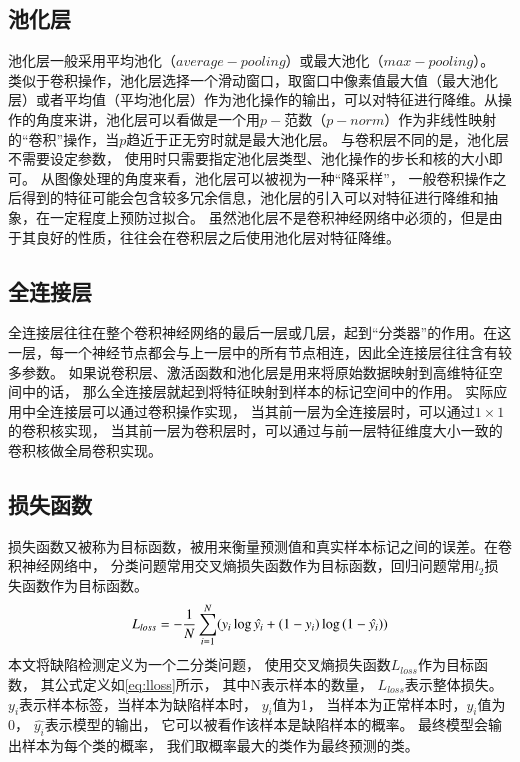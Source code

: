 \subsection{池化层}

池化层一般采用平均池化（$average-pooling$）或最大池化（$max-pooling$）。
类似于卷积操作，池化层选择一个滑动窗口，取窗口中像素值最大值（最大池化层）或者平均值（平均池化层）作为池化操作的输出，可以对特征进行降维。从操作的角度来讲，池化层可以看做是一个用$p-$范数（$p-norm$）作为非线性映射的“卷积”操作，当$p$趋近于正无穷时就是最大池化层。
与卷积层不同的是，池化层不需要设定参数，
使用时只需要指定池化层类型、池化操作的步长和核的大小即可。
从图像处理的角度来看，池化层可以被视为一种“降采样”，
一般卷积操作之后得到的特征可能会包含较多冗余信息，池化层的引入可以对特征进行降维和抽象，在一定程度上预防过拟合。
虽然池化层不是卷积神经网络中必须的，但是由于其良好的性质，往往会在卷积层之后使用池化层对特征降维。

\subsection{全连接层}

全连接层往往在整个卷积神经网络的最后一层或几层，起到“分类器”的作用。在这一层，每一个神经节点都会与上一层中的所有节点相连，因此全连接层往往含有较多参数。
如果说卷积层、激活函数和池化层是用来将原始数据映射到高维特征空间中的话，
那么全连接层就起到将特征映射到样本的标记空间中的作用。
实际应用中全连接层可以通过卷积操作实现，
当其前一层为全连接层时，可以通过$1\times 1$的卷积核实现，
当其前一层为卷积层时，可以通过与前一层特征维度大小一致的卷积核做全局卷积实现。

\subsection{损失函数}
\label{subseciont:sunshihanshu}

损失函数又被称为目标函数，被用来衡量预测值和真实样本标记之间的误差。在卷积神经网络中，
分类问题常用交叉熵损失函数作为目标函数，回归问题常用$l_2$损失函数作为目标函数。
\begin{equation}
\centering
L_{loss}=-\frac{1}{N}\sum_{i=1}^N(y_i\log{\hat{y_i}+(1-y_i)\log{(1-\hat{y_i})}})
\label{eq:lloss}
\end{equation}
本文将缺陷检测定义为一个二分类问题，
使用交叉熵损失函数$L_{loss}$作为目标函数，
其公式定义如\eqref{eq:lloss}所示，
其中N表示样本的数量，
$L_{loss}$表示整体损失。
$y_i$表示样本标签，当样本为缺陷样本时，
$y_i$值为1，
当样本为正常样本时，$y_i$值为0，
$\hat{y_i}$表示模型的输出，
它可以被看作该样本是缺陷样本的概率。
最终模型会输出样本为每个类的概率，
我们取概率最大的类作为最终预测的类。

